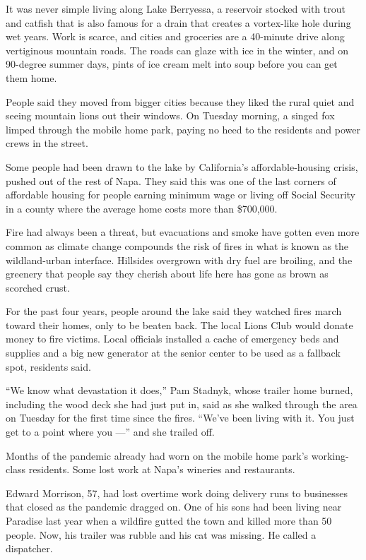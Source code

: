It was never simple living along Lake Berryessa, a reservoir stocked
with trout and catfish that is also famous for a drain that creates a
vortex-like hole during wet years. Work is scarce, and cities and
groceries are a 40-minute drive along vertiginous mountain roads. The
roads can glaze with ice in the winter, and on 90-degree summer days,
pints of ice cream melt into soup before you can get them home.

People said they moved from bigger cities because they liked the rural
quiet and seeing mountain lions out their windows. On Tuesday morning, a
singed fox limped through the mobile home park, paying no heed to the
residents and power crews in the street.

Some people had been drawn to the lake by California's
affordable-housing crisis, pushed out of the rest of Napa. They said
this was one of the last corners of affordable housing for people
earning minimum wage or living off Social Security in a county where the
average home costs more than \$700,000.

Fire had always been a threat, but evacuations and smoke have gotten
even more common as climate change compounds the risk of fires in what
is known as the wildland-urban interface. Hillsides overgrown with dry
fuel are broiling, and the greenery that people say they cherish about
life here has gone as brown as scorched crust.

For the past four years, people around the lake said they watched fires
march toward their homes, only to be beaten back. The local Lions Club
would donate money to fire victims. Local officials installed a cache of
emergency beds and supplies and a big new generator at the senior center
to be used as a fallback spot, residents said.

``We know what devastation it does,'' Pam Stadnyk, whose trailer home
burned, including the wood deck she had just put in, said as she walked
through the area on Tuesday for the first time since the fires. ``We've
been living with it. You just get to a point where you ---'' and she
trailed off.

Months of the pandemic already had worn on the mobile home park's
working-class residents. Some lost work at Napa's wineries and
restaurants.

Edward Morrison, 57, had lost overtime work doing delivery runs to
businesses that closed as the pandemic dragged on. One of his sons had
been living near Paradise last year when a wildfire gutted the town and
killed more than 50 people. Now, his trailer was rubble and his cat was
missing. He called a dispatcher.

